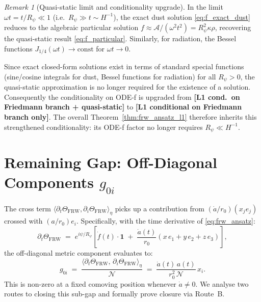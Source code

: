\documentclass[12pt,a4paper]{article}
\theoremstyle{definition}
\theoremstyle{remark}
\newtheorem{remark}[theorem]{Remark}
\begin{document}
\begin{remark}[Quasi-static limit and conditionality upgrade]
\label{rem:quasi_static_limit}
In the limit $\omega t = t/R_\psi \ll 1$ (i.e.\ $R_\psi \gg t \sim H^{-1}$),
the exact dust solution \eqref{eq:f_exact_dust} reduces to the algebraic
particular solution $f \approx \mathcal{A}/(\omega^2 t^2) = R_\psi^2\kappa\rho$,
recovering the quasi-static result \eqref{eq:f_particular}.
Similarly, for radiation, the Bessel functions
$J_{1/4}(\omega t) \to \text{const}$ for $\omega t \to 0$.

Since exact closed-form solutions exist in terms of standard special functions
(sine/cosine integrals for dust, Bessel functions for radiation) for all
$R_\psi > 0$, the quasi-static approximation is no longer required for the
existence of a solution.
Consequently the conditionality on ODE-f is upgraded from
\textbf{[L1 cond.\ on Friedmann branch + quasi-static]} to
\textbf{[L1 conditional on Friedmann branch only]}.
The overall Theorem~\ref{thm:frw_ansatz_l1} therefore inherits this
strengthened conditionality: its ODE-f factor no longer requires $R_\psi\ll H^{-1}$.
\end{remark}

\section{Remaining Gap: Off-Diagonal Components $g_{0i}$}
\label{sec:gap_0i}

The cross term $\langle\partial_t\Theta_{\mathrm{FRW}},\partial_i\Theta_{\mathrm{FRW}}\rangle_\eta$
picks up a contribution from $(\dot{a}/r_0)(x_j e_j)$ crossed with $(a/r_0)e_i$.
Specifically, with the time derivative of \eqref{eq:frw_ansatz}:
\begin{equation}
  \partial_t\Theta_{\mathrm{FRW}}
  \;=\;
  e^{i\psi/R_\psi}\!\left[
    \dot{f}(t)\cdot\mathbf{1}
    \;+\;
    \frac{\dot{a}(t)}{r_0}\!\left(x\,e_1+y\,e_2+z\,e_3\right)
  \right],
\end{equation}
the off-diagonal metric component evaluates to:
\begin{equation}
  \label{eq:g0i_raw}
  g_{0i}
  \;=\;
  \frac{\langle\partial_t\Theta_{\mathrm{FRW}},\,\partial_i\Theta_{\mathrm{FRW}}\rangle_\eta}{\mathcal{N}}
  \;=\;
  \frac{\dot{a}(t)\,a(t)}{r_0^2\,\mathcal{N}}\,x_i.
\end{equation}
This is non-zero at a fixed comoving position whenever $\dot{a}\neq 0$.
We analyse two routes to closing this sub-gap and formally prove closure via Route~B.
\end{document}
